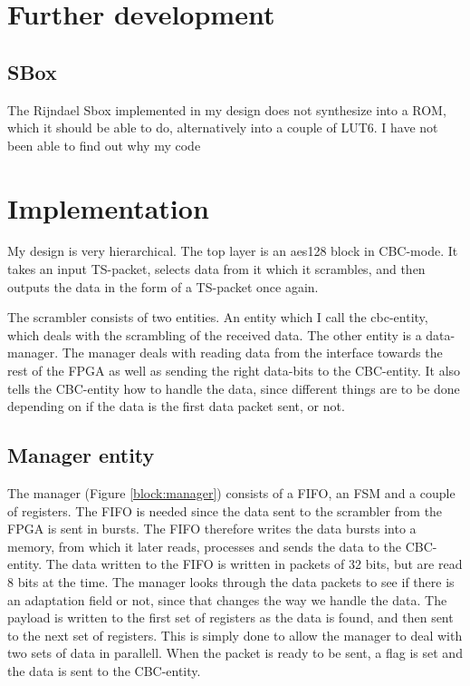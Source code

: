 \section{Further development}

\subsection{SBox}
The Rijndael Sbox implemented in my design does not synthesize into a 
ROM, which it should be able to do, alternatively into a couple of LUT6.
I have not been able to find out why my code 

\section{Implementation}
My design is very hierarchical. The top layer is an aes128 block in 
CBC-mode. It takes an input TS-packet, selects data from it which it 
scrambles, and then outputs the data in the form of a TS-packet once 
again.

The scrambler consists of two entities. An entity which I call the 
cbc-entity, which deals with the scrambling of the received data. The 
other entity is a data-manager. The manager deals with reading data 
from the interface towards the rest of the FPGA as well as sending the 
right data-bits to the CBC-entity. It also tells the CBC-entity how to 
handle the data, since different things are to be done depending on if 
the data is the first data packet sent, or not.

\subsection{Manager entity}
The manager (Figure \ref{block:manager}) consists of a FIFO, an FSM and 
a couple of registers. The FIFO is needed since the data sent to the 
scrambler from the FPGA is sent in bursts. The FIFO therefore writes 
the data bursts into a memory, from which it later reads, processes and 
sends the data to the CBC-entity. The data written to the FIFO is 
written in packets of 32 bits, but are read 8 bits at the time. The 
manager looks through the data packets to see if there is an adaptation 
field or not, since that changes the way we handle the data. The 
payload is written to the first set of registers as the data is found, 
and then sent to the next set of registers. This is simply done to 
allow the manager to deal with two sets of data in parallell. When the 
packet is ready to be sent, a flag is set and the data is sent to the 
CBC-entity. 

